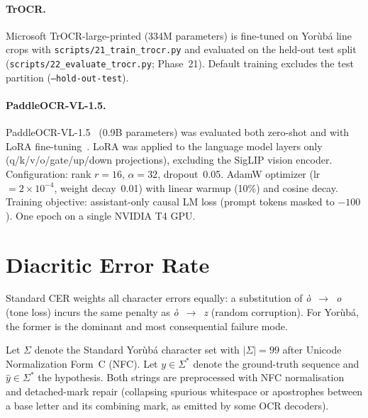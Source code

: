 \documentclass{article}
\newcommand{\Yoruba}{Yor\`ub\'a}
\begin{document}
\paragraph{TrOCR.}
Microsoft TrOCR-large-printed (334M parameters) is fine-tuned on Yorùbá line crops with \texttt{scripts/21\_train\_trocr.py} and evaluated on the held-out test split (\texttt{scripts/22\_evaluate\_trocr.py}; Phase~21). Default training excludes the test partition (\texttt{--hold-out-test}).

\paragraph{PaddleOCR-VL-1.5.}
PaddleOCR-VL-1.5~\cite{cui2026paddleocrvl} (0.9B parameters) was evaluated both zero-shot and with LoRA fine-tuning~\cite{hu2022lora}. LoRA was applied to the language model layers only (q/k/v/o/gate/up/down projections), excluding the SigLIP vision encoder. Configuration: rank $r{=}16$, $\alpha{=}32$, dropout~0.05. AdamW optimizer (lr$=2{\times}10^{-4}$, weight decay~0.01) with linear warmup (10\%) and cosine decay. Training objective: assistant-only causal LM loss (prompt tokens masked to $-100$). One epoch on a single NVIDIA T4 GPU.

\section{Diacritic Error Rate}
\label{sec:der}

Standard CER weights all character errors equally: a substitution of \emph{\`o}~$\to$~\emph{o} (tone loss) incurs the same penalty as \emph{\`o}~$\to$~\emph{z} (random corruption). For \Yoruba{}, the former is the dominant and most consequential failure mode.

Let $\Sigma$ denote the Standard \Yoruba{} character set with $|\Sigma|{=}99$ after Unicode Normalization Form~C (NFC). Let $y \in \Sigma^\ast$ denote the ground-truth sequence and $\hat{y} \in \Sigma^\ast$ the hypothesis. Both strings are preprocessed with NFC normalisation and detached-mark repair (collapsing spurious whitespace or apostrophes between a base letter and its combining mark, as emitted by some OCR decoders).
\end{document}
